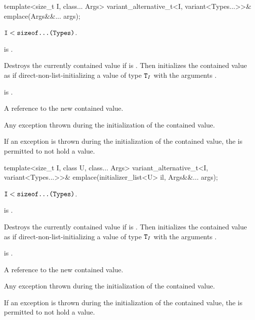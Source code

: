%
\begin{itemdecl}
template<size_t I, class... Args>
  variant_alternative_t<I, variant<Types...>>& emplace(Args&&... args);
\end{itemdecl}

\begin{itemdescr}
\pnum
\mandates
$\texttt{I} < \texttt{sizeof...(Types)}$.

\pnum
\constraints
{} is .

\pnum
\effects
Destroys the currently contained value if 
is .
Then initializes the contained value as if direct-non-list-initializing
a value of type $\texttt{T}_I$
with the arguments .

\pnum
\ensures
{} is .

\pnum
\returns
A reference to the new contained value.

\pnum
\throws
Any exception thrown during the initialization of the contained value.

\pnum
\remarks
If an exception is thrown during the initialization of the contained value,
the  is permitted to not hold a value.
\end{itemdescr}

%
\begin{itemdecl}
template<size_t I, class U, class... Args>
  variant_alternative_t<I, variant<Types...>>& emplace(initializer_list<U> il, Args&&... args);
\end{itemdecl}

\begin{itemdescr}
\pnum
\mandates
$\texttt{I} < \texttt{sizeof...(Types)}$.

\pnum
\constraints
{} is .

\pnum
\effects
Destroys the currently contained value if 
is .
Then initializes the contained value as if direct-non-list-initializing
a value of type $\texttt{T}_I$
with the arguments .

\pnum
\ensures
{} is .

\pnum
\returns
A reference to the new contained value.

\pnum
\throws
Any exception thrown during the initialization of the contained value.

\pnum
\remarks
If an exception is thrown during the initialization of the contained value,
the  is permitted to not hold a value.
\end{itemdescr}


